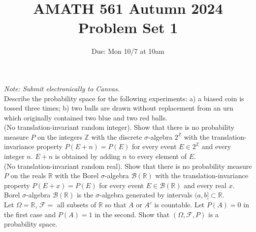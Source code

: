 \documentclass[11pt]{article}
\title{AMATH 561 Autumn 2024 \\ Problem Set 1}
\date{Due: Mon 10/7 at 10am}
\begin{document}
\maketitle

{\it Note: Submit electronically to Canvas. }
\\

 Describe the probability space for the following experiments: a) a biased coin is tossed three times; b)  two balls are drawn without replacement from an urn which originally contained two blue and two red balls.
\\

 (No translation-invariant random integer). Show that there is no probability measure $P$ on the integers $\mathds{Z}$ with the discrete
$\sigma$-algebra $2^{\mathds{Z}}$ with the translation-invariance property $P(E + n) = P(E)$ for every event $E \in 2^{\mathds{Z}}$ and every integer $n$. $E+n$ is obtained by adding $n$ to every element of $E$.
\\

  (No translation-invariant random real). Show that there is no probability measure $P$ on the reals $\mathds{R}$ with the Borel
$\sigma$-algebra $\mathcal{B}(\mathds{R})$ with the translation-invariance property $P(E + x) = P(E)$ for every event $E \in \mathcal{B}(\mathds{R})$ and every real $x$. Borel $\sigma$-algebra $\mathcal{B}(\mathds{R})$ is the $\sigma$-algebra generated by intervals $(a,b] \subset \mathds{R}$.
\\

 Let $\Omega=\mathds{R}$, $\mathcal{F}=$ all subsets of $\mathds{R}$ so that $A$ or $A^c$ is countable. Let $P(A)=0$ in the first case and $P(A)=1$ in the second. Show that $(\Omega, \mathcal{F}, P)$ is a probability space.
\end{document}

